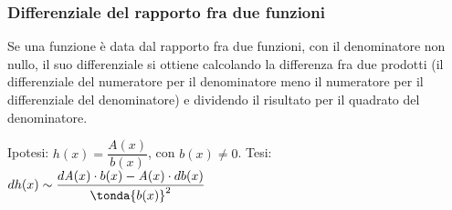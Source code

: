 \subsubsection{Differenziale del rapporto fra due funzioni}
\label{}
\begin{teorema}
 Se una funzione è data dal rapporto fra due funzioni, con il denominatore
 non nullo, il suo  differenziale si ottiene calcolando
 la differenza fra due prodotti (il differenziale del numeratore per il 
 denominatore meno il numeratore per il differenziale del denominatore)
 e dividendo il risultato per il quadrato del denominatore.
\end{teorema}
\noindent Ipotesi: $h(x)=\dfrac{\mathit{A}(x)}{b(x)}$, con $b(x)\neq 
0$.\tab 
Tesi: 
$dh(x) \sim \dfrac{d\mathit{A}(x) \cdot b(x)-\mathit{A}(x) \cdot db(x)}
             {\tonda{b(x)}^2}$

